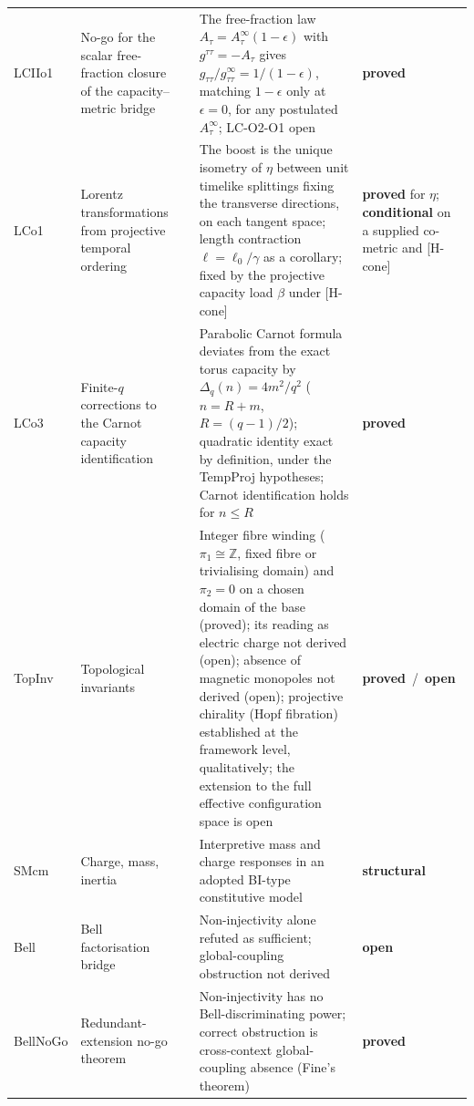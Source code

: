 \documentclass[11pt,a4paper]{article}
\newcommand{\sproved}{\textcolor{cproved}{\textbf{proved}}}
\newcommand{\sstruct}{\textcolor{cstruct}{\textbf{structural}}}
\newcommand{\sopen}{\textcolor{copen}{\textbf{open}}}
\newcommand{\scond}{\textcolor{ccond}{\textbf{conditional}}}
\begin{document}
\begin{longtable}{@{}p{1.70cm}p{2.9cm}p{1.3cm}p{6.25cm}>{\raggedright\arraybackslash}p{2.0cm}@{}}
      LCIIo1 & No-go for the scalar free-fraction closure of the capacity--metric bridge &
      \cite{Beau2026lco2o1} &
      The free-fraction law $A_\tau = A_\tau^\infty(1-\epsilon)$ with $g^{\tau\tau} = -A_\tau$
      gives $g_{\tau\tau}/g_{\tau\tau}^\infty = 1/(1-\epsilon)$, matching $1-\epsilon$ only at
      $\epsilon = 0$, for any postulated $A_\tau^\infty$; LC-O2-O1 open &
      \sproved \\[3pt]
      LCo1 & Lorentz transformations from projective temporal ordering & \cite{Beau2026lco1} &
      The boost is the unique isometry of $\eta$ between unit timelike splittings fixing the transverse directions,
      on each tangent space; length contraction
      $\ell=\ell_0/\gamma$ as a corollary; fixed by the projective capacity load $\beta$ under [H-cone] &
      \sproved{} for $\eta$; \scond{} on a supplied co-metric and [H-cone] \\[3pt]
      LCo3 & Finite-$q$ corrections to the Carnot capacity identification & \cite{Beau2026lco3} &
      Parabolic Carnot formula deviates from the exact torus capacity by
      $\Delta_q(n)=4m^2/q^2$ ($n=R+m$, $R=(q-1)/2$); quadratic identity exact by definition, under the TempProj hypotheses; Carnot
      identification holds for $n\leq R$ &
      \sproved \\[3pt]
      TopInv & Topological invariants & \cite{Beau2026k} &
      Integer fibre winding ($\pi_1 \cong \mathbb{Z}$, fixed fibre or trivialising domain) and $\pi_2 = 0$ on a
      chosen domain of the base (proved); its reading as electric charge not derived (open);
      absence of magnetic monopoles not derived (open);
      projective chirality (Hopf fibration) established at the framework level, qualitatively; the extension
      to the full effective configuration space is open &
      \sproved\ /\ \sopen \\[3pt]
      SMcm & Charge, mass, inertia & \cite{Beau2026e} &
      Interpretive mass and charge responses in an adopted BI-type constitutive model &
      \sstruct \\[3pt]
      Bell & Bell factorisation bridge & \cite{Beau2026b} &
      Non-injectivity alone refuted as sufficient; global-coupling obstruction not derived &
      \sopen \\[3pt]
      BellNoGo & Redundant-extension no-go theorem & \cite{Beau2026BellNoGo} &
      Non-injectivity has no Bell-discriminating power; correct obstruction is cross-context
      global-coupling absence (Fine's theorem) &
      \sproved \\[3pt]

\end{longtable}
\end{document}

